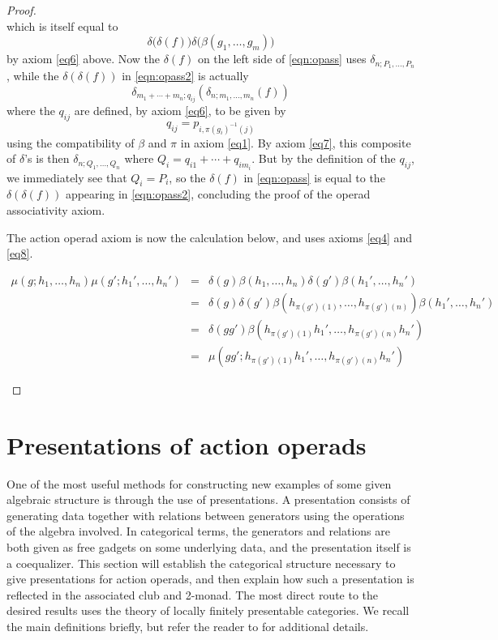 \documentclass{amsbook} %
\newenvironment{eqn}{\begin{equation}}{\end{equation}}
\numberwithin{section}{chapter}
\begin{document}
\begin{proof}
\[\]
which is itself equal to
\begin{eqn}\label{eqn:opass2}
\delta\big(\delta(f)\big) \delta\big(\beta(g_{1}, \ldots, g_{m})\big)
\end{eqn}by axiom \eqref{eq6} above.  Now the $\delta(f)$ on the left side of \cref{eqn:opass} uses $\delta_{n; P_{1}, \ldots, P_{n}}$, while the $\delta(\delta(f))$ in \cref{eqn:opass2} is actually
\[
\delta_{m_1 + \cdots + m_{n}; q_{ij}}(\delta_{n; m_{1}, \ldots, m_{n}} (f))
\]
where the $q_{ij}$ are defined, by axiom \eqref{eq6}, to be given by
\[
q_{ij} = p_{i,\pi(g_{i})^{-1}(j)}
\]
using the compatibility of $\beta$ and $\pi$ in axiom \eqref{eq1}.  By axiom \eqref{eq7}, this composite of $\delta$'s  is then $\delta_{n; Q_{1}, \ldots, Q_{n}}$ where $Q_{i} = q_{i1} + \cdots + q_{im_{i}}$.  But by the definition of the $q_{ij}$, we immediately see that $Q_{i} = P_{i}$, so the $\delta(f)$ in \cref{eqn:opass} is equal to the $\delta(\delta(f))$ appearing in \cref{eqn:opass2}, concluding the proof of the operad associativity axiom.

The action operad axiom is now the calculation below, and uses axioms \eqref{eq4} and \eqref{eq8}.
\begin{small}
\[
\begin{array}{rcl}
\mu(g; h_{1}, \ldots, h_{n})\mu(g'; h_{1}', \ldots, h_{n}') & = & \delta(g) \beta(h_{1}, \ldots, h_{n}) \delta(g') \beta(h_{1}', \ldots, h_{n}') \\
& = & \delta(g) \delta(g') \beta(h_{\pi(g')(1)}, \ldots, h_{\pi(g')(n)})  \beta(h_{1}', \ldots, h_{n}') \\
& = & \delta(gg') \beta(h_{\pi(g')(1)}h_{1}', \ldots, h_{\pi(g')(n)}h_{n}') \\
& = & \mu(gg'; h_{\pi(g')(1)}h_{1}', \ldots, h_{\pi(g')(n)}h_{n}')
\end{array}
\]
\end{small}
\end{proof}



\section{Presentations of action operads}\label{sec:presofacops}

One of the most useful methods for constructing new examples of some given algebraic structure is through the use of presentations.  A presentation consists of generating data together with relations between generators using the operations of the algebra involved.  In categorical terms, the generators  and relations are both given as free gadgets on some underlying data, and the presentation itself is a coequalizer.  This section will establish the categorical structure necessary to give presentations for action operads, and then explain how such a presentation is reflected in the associated club and 2-monad.  The most direct route to the desired results uses the theory of locally finitely presentable categories.  We recall the main definitions briefly, but refer the reader to \cite{ar} for additional details.
\end{document}
